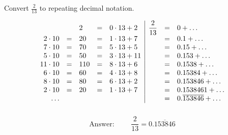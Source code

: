 \begin{frame}
\begin{example}
Convert $\displaystyle \frac{2}{13}$ to repeating decimal notation.
 
\[
\begin{array}{rclcl|rcl}
\displaystyle &&2 &=& \displaystyle 0\cdot 13 + 2                  & \displaystyle \frac{2}{13} &=& 0 + \dots \\
\displaystyle 2 \cdot 10 & = & 20 &=& \displaystyle 1\cdot 13 + 7  &                            &=& 0.1 + \dots \\
\displaystyle 7 \cdot 10 & = & 70 &=& \displaystyle 5\cdot 13 + 5  &                            &=& 0.15 + \dots \\ 
\displaystyle 5 \cdot 10 & = & 50 &=& \displaystyle 3\cdot 13 + 11 &                            &=& 0.153 + \dots\\
\displaystyle 11\cdot 10 & = & 110&=& \displaystyle 8\cdot 13 + 6  &                            &=& 0.1538 + \dots\\
\displaystyle 6 \cdot 10 & = & 60 &=& \displaystyle 4\cdot 13 + 8  &                            &=& 0.15384+\dots\\
\displaystyle 8 \cdot 10 & = & 80 &=& \displaystyle 6\cdot 13 + 2  &                            &=& 0.153846+\dots\\
\displaystyle 2 \cdot 10 & = & 20 &=& \displaystyle 1\cdot 13 + 7  &                            &=& 0.1538461+\dots\\
\dots                    &   &    & &                              &                            &=& 0.\overline{153846}+\dots\\ \\
\end{array}
\]
\vskip -0.2cm
\[
\text{Answer: }\qquad \frac{2}{13}= 0.\overline{153846}
\]
\end{example}
	
\end{frame}